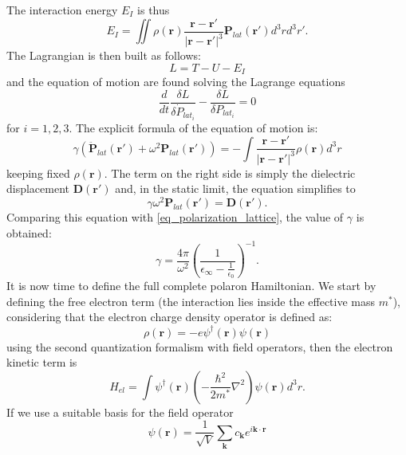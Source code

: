 \documentclass[12pt, a4paper]{report}
\numberwithin{equation}{section}
\begin{document}
The interaction energy $E_I$ is thus
\begin{equation}
    E_I=\iint \rho(\mathbf{r})\frac{\mathbf{r}-\mathbf{r}'}{|\mathbf{r}-\mathbf{r}'|^3}\mathbf{P}_{lat}(\mathbf{r}')d^3rd^3r'.
\end{equation}
The Lagrangian is then built as follows:
\begin{equation}
    L=T-U-E_I
\end{equation}
and the equation of motion are found solving the Lagrange equations
\begin{equation}
    \frac{d}{dt}\frac{\delta L}{\delta \dot{P}_{lat_i}}-\frac{\delta L}{\delta P_{lat_i}}=0
\end{equation}
for $i=1,2,3$. The explicit formula of the equation of motion is:
\begin{equation}
    \gamma(\ddot{\mathbf{P}}_{lat}(\mathbf{r}')+\omega^2\mathbf{P}_{lat}(\mathbf{r}'))=-\int \frac{\mathbf{r}-\mathbf{r}'}{|\mathbf{r}-\mathbf{r'}|^3}\rho(\mathbf{r})d^3r
\end{equation}
keeping fixed $\rho(\mathbf{r})$. The term on the right side is simply the dielectric displacement $\mathbf{D}(\mathbf{r}')$ and, in the 
static limit, the equation simplifies to
\begin{equation}
    \gamma\omega^2\mathbf{P}_{lat}(\mathbf{r}')=\mathbf{D}(\mathbf{r}').
\end{equation}
Comparing this equation with \ref{eq_polarization_lattice}, the value of $\gamma$ is obtained:
\begin{equation}
    \gamma = \frac{4\pi}{\omega^2}\left(\frac{1}{\epsilon_\infty-\frac{1}{\epsilon_0}}\right)^{-1}.
\end{equation}
It is now time to define the full complete polaron Hamiltonian. We start by defining the free electron term (the interaction lies inside 
the effective mass $m^*$), considering that the electron charge density operator is defined as:
\begin{equation}
    \rho(\mathbf{r})=-e\psi^\dagger(\mathbf{r})\psi(\mathbf{r})
\end{equation}
using the second quantization formalism with field operators, then the electron kinetic term is
\begin{equation}
    H_{el}=\int\psi^\dagger(\mathbf{r})\left(-\frac{\hbar^2}{2m^*}\nabla^2\right)\psi(\mathbf{r})d^3r.
    \label{el_kinetic_hamiltonian_r_formalism}
\end{equation}
If we use a suitable basis for the field operator
\begin{equation}
    \psi(\mathbf{r})=\frac{1}{\sqrt{V}}\sum_\mathbf{k}c_\mathbf{k}e^{i\mathbf{k}\cdot\mathbf{r}}
\end{equation}
\end{document}
